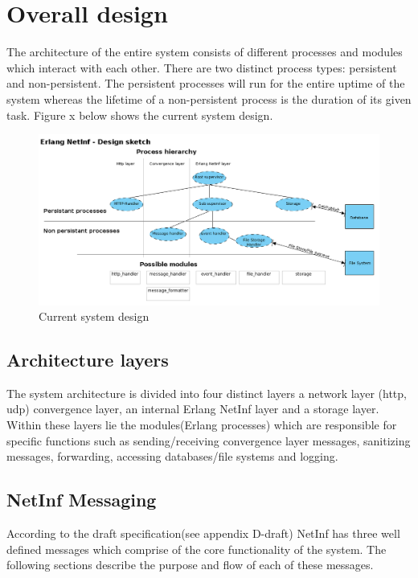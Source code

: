 \section {Overall design}

The architecture of the entire system consists of different processes and modules which interact with each other. There are two distinct process types: persistent and non-persistent. The persistent processes will run for the entire uptime of the system whereas the lifetime of a non-persistent process is the duration of its given task. Figure x below shows the current system design.

\begin{figure}[h!]
	\centering
\includegraphics[scale=0.6]{./img/process_hierarchy.png}
\caption{Current system design}
\end{figure}

\subsection{Architecture layers}

The system architecture is divided into four distinct layers a network layer (http, udp) convergence layer, an internal Erlang NetInf layer and a storage layer. Within these layers lie the modules(Erlang processes) which are responsible for specific functions such as sending/receiving convergence layer messages, sanitizing messages, forwarding, accessing databases/file systems and logging.

\subsection{NetInf Messaging}

According to the draft specification(see appendix D-draft) NetInf has three well defined messages which comprise of the core functionality of the system. The following sections describe the purpose and flow of each of these messages.

